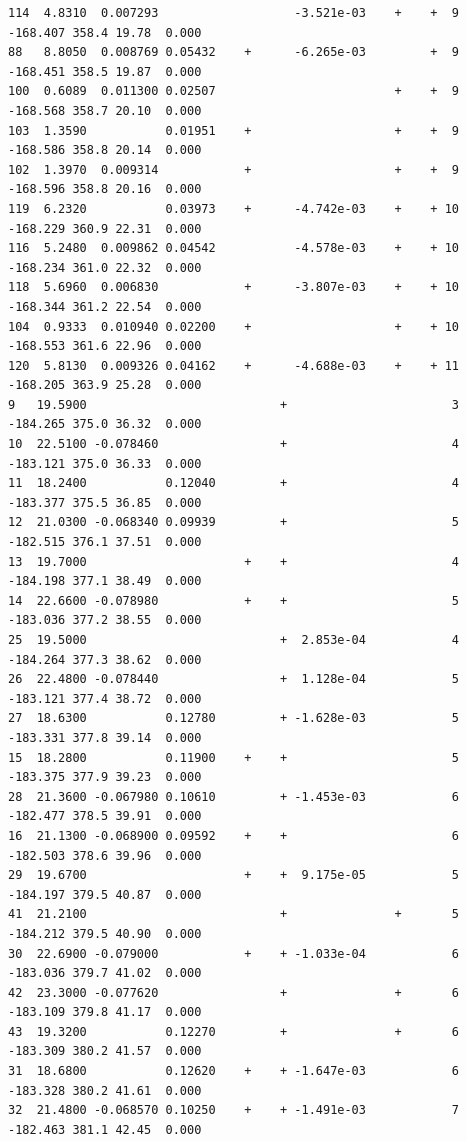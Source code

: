 \documentclass[
  oneside]{krantz}
\begin{document}
\begin{verbatim}
114  4.8310  0.007293                   -3.521e-03    +    +  9 -168.407 358.4 19.78  0.000
88   8.8050  0.008769 0.05432    +      -6.265e-03         +  9 -168.451 358.5 19.87  0.000
100  0.6089  0.011300 0.02507                         +    +  9 -168.568 358.7 20.10  0.000
103  1.3590           0.01951    +                    +    +  9 -168.586 358.8 20.14  0.000
102  1.3970  0.009314            +                    +    +  9 -168.596 358.8 20.16  0.000
119  6.2320           0.03973    +      -4.742e-03    +    + 10 -168.229 360.9 22.31  0.000
116  5.2480  0.009862 0.04542           -4.578e-03    +    + 10 -168.234 361.0 22.32  0.000
118  5.6960  0.006830            +      -3.807e-03    +    + 10 -168.344 361.2 22.54  0.000
104  0.9333  0.010940 0.02200    +                    +    + 10 -168.553 361.6 22.96  0.000
120  5.8130  0.009326 0.04162    +      -4.688e-03    +    + 11 -168.205 363.9 25.28  0.000
9   19.5900                           +                       3 -184.265 375.0 36.32  0.000
10  22.5100 -0.078460                 +                       4 -183.121 375.0 36.33  0.000
11  18.2400           0.12040         +                       4 -183.377 375.5 36.85  0.000
12  21.0300 -0.068340 0.09939         +                       5 -182.515 376.1 37.51  0.000
13  19.7000                      +    +                       4 -184.198 377.1 38.49  0.000
14  22.6600 -0.078980            +    +                       5 -183.036 377.2 38.55  0.000
25  19.5000                           +  2.853e-04            4 -184.264 377.3 38.62  0.000
26  22.4800 -0.078440                 +  1.128e-04            5 -183.121 377.4 38.72  0.000
27  18.6300           0.12780         + -1.628e-03            5 -183.331 377.8 39.14  0.000
15  18.2800           0.11900    +    +                       5 -183.375 377.9 39.23  0.000
28  21.3600 -0.067980 0.10610         + -1.453e-03            6 -182.477 378.5 39.91  0.000
16  21.1300 -0.068900 0.09592    +    +                       6 -182.503 378.6 39.96  0.000
29  19.6700                      +    +  9.175e-05            5 -184.197 379.5 40.87  0.000
41  21.2100                           +               +       5 -184.212 379.5 40.90  0.000
30  22.6900 -0.079000            +    + -1.033e-04            6 -183.036 379.7 41.02  0.000
42  23.3000 -0.077620                 +               +       6 -183.109 379.8 41.17  0.000
43  19.3200           0.12270         +               +       6 -183.309 380.2 41.57  0.000
31  18.6800           0.12620    +    + -1.647e-03            6 -183.328 380.2 41.61  0.000
32  21.4800 -0.068570 0.10250    +    + -1.491e-03            7 -182.463 381.1 42.45  0.000

\end{verbatim}
\end{document}
